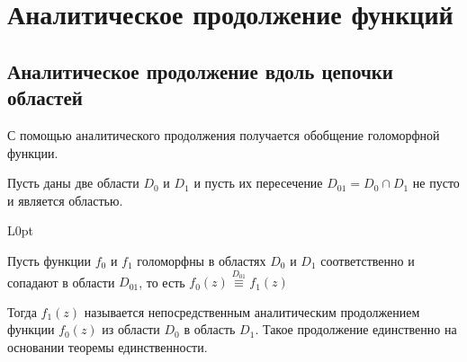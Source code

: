 \documentclass[a4paper, 12pt]{article}
\begin{document}
\section{Аналитическое продолжение функций}
\subsection{Аналитическое продолжение вдоль цепочки областей}
С помощью аналитического продолжения получается обобщение голоморфной функции.

Пусть даны две области $D_0$ и $D_1$ и пусть их пересечение $D_{01}=D_0 \cap D_1$ не пусто и является областью.
\begin{wrapfigure}{L}{0pt}
\end{wrapfigure}
Пусть функции $f_0$ и $f_1$ голоморфны в областях $D_0$ и $D_1$ соответственно и сопадают в области $D_{01}$, то есть
$f_0(z) \overset{D_{01}}{\equiv} f_1(z)$

Тогда $f_1(z)$ называется непосредственным аналитическим продолжением функции $f_0(z)$ из области $D_0$ в область $D_1$.
Такое продолжение единственно на основании теоремы единственности.
\end{document}
